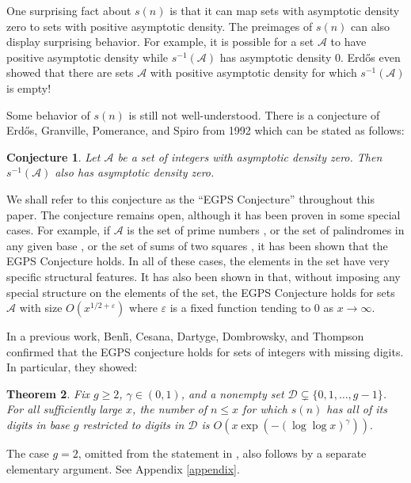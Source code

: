\documentclass[11pt, reqno]{amsart}
\newtheorem{theorem}{Theorem}
\newtheorem{conjecture}[theorem]{Conjecture}
\theoremstyle{remark}
\numberwithin{theorem}{section}
\numberwithin{proposition}{section}
\numberwithin{lemma}{section}
\numberwithin{corollary}{section}
\numberwithin{equation}{section}
\numberwithin{conjecture}{section}
\numberwithin{definition}{section}
\begin{document}
One surprising fact about $s(n)$ is that it can map sets with asymptotic density zero to sets with positive asymptotic density. The preimages of $s(n)$ can also display surprising behavior. For example, it is possible for a set $\mathcal{A}$ to have positive asymptotic density while $s^{-1}(\mathcal{A})$ has asymptotic density $0$. Erd\H{o}s even showed that there are sets $\mathcal{A}$ with positive asymptotic density for which $s^{-1}(\mathcal{A})$ is empty!

Some behavior of $s(n)$ is still not well-understood. There is a conjecture of Erd\H{o}s, Granville, Pomerance, and Spiro \cite{egps} from 1992 which can be stated as follows:

\begin{conjecture} Let $\mathcal{A}$ be a set of integers with asymptotic density zero. Then $s^{-1}(\mathcal{A})$ also has asymptotic density zero.    
\end{conjecture}

We shall refer to this conjecture as the ``EGPS Conjecture'' throughout this paper. The conjecture remains open, although it has been proven in some special cases. For example, if $\mathcal{A}$ is the set of prime numbers \cite{Pollack2014}, or the set of palindromes in any given base \cite{PollackPalindromes}, or the set of sums of two squares \cite{TroupeSumofsquares}, it has been shown that the EGPS Conjecture holds. In all of these cases, the elements in the set have very specific structural features. It has also been shown in \cite{PollackPomeranceThompson} that, without imposing any special structure on the elements of the set, the EGPS Conjecture holds for sets $\mathcal{A}$ with size $O(x^{1/2 + \varepsilon})$ where $\varepsilon$ is a fixed function tending to $0$ as $x \rightarrow \infty$. 

In a previous work, Benl\.{i}, Cesana, Dartyge, Dombrowsky, and Thompson  confirmed that the EGPS conjecture holds for sets of integers with missing digits. In particular, they showed:

\begin{theorem} \cite[Theorem 1.8]{bcddt}\label{short theorem in intro}\label{thm: bcddt} 
Fix $g\geq 2$, $\gamma\in(0,1)$, and a nonempty set $\mathcal{D}\subsetneq \{0,1,\dots, g-1\}$. For all sufficiently large $x$, the number of $n\leq x$ for which $s(n)$ has all of its digits in base $g$ restricted to digits in $\mathcal{D}$ is $O(x\exp(-(\log\log x)^\gamma)).$ 
\end{theorem}

The case $g = 2$, omitted from the statement in \cite{bcddt}, also follows by a separate elementary argument. See Appendix \ref{appendix}. 
\end{document}
